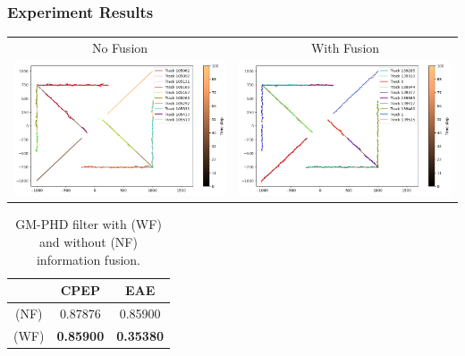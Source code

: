 \begin{frame}\frametitle{Experiment Results}
    \begin{center}
    \begin{tabular}{c c} 
     No Fusion & With Fusion \\ [0.1ex] 
        \includegraphics[width=0.45\linewidth]{pic/nf-traj.png}
    &
        \includegraphics[width=0.45\linewidth]{pic/wf-traj.png}
    \\ [1ex]
    \end{tabular}
    \end{center}

    \begin{table}
    \begin{center}
    \begin{tabular}{ | c || c | c | }
        \hline
                & CPEP              & EAE               \\ [0.5ex]
        \hline\hline
        (NF)    & 0.87876           & 0.85900           \\ 
        (WF)    & \textbf{0.85900}  & \textbf{0.35380}  \\ [0.6ex]
        \hline
    \end{tabular}
    \end{center}
    \caption{GM-PHD filter with (WF) and without (NF) information fusion.}
    \end{table}
\end{frame}

